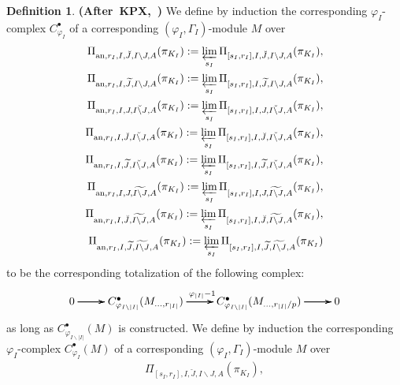 \documentclass[12pt]{amsart}
\theoremstyle{definition}
\newtheorem{definition}[theorem]{Definition}
\numberwithin{equation}{section}
\begin{document}
\begin{definition} \mbox{\bf{(After KPX, \cite[Definition 2.3.3]{KPX})}}
We define by induction the corresponding $\varphi_I$-complex $C^\bullet_{\varphi_I}$ of a corresponding $(\varphi_I,\Gamma_I)$-module $M$ over 
\begin{align}
\Pi_{\mathrm{an},r_I,I,\breve{J},I\backslash J,A}(\pi_{K_I}):=\varprojlim_{s_I}\Pi_{[s_I,r_I],I,\breve{J},I\backslash J,A}(\pi_{K_I}),\\	
\Pi_{\mathrm{an},r_I,I,\widetilde{J},I\backslash J,A}(\pi_{K_I}):=\varprojlim_{s_I} \Pi_{[s_I,r_I],I,\widetilde{J},I\backslash J,A}(\pi_{K_I}),\\
\Pi_{\mathrm{an},r_I,I,J,\breve{I\backslash J},A}(\pi_{K_I}):=\varprojlim_{s_I}\Pi_{[s_I,r_I],I,J,\breve{I\backslash J},A}(\pi_{K_I}),\\	
\Pi_{\mathrm{an},r_I,I,\breve{J},\breve{I\backslash J},A}(\pi_{K_I}):=\varprojlim_{s_I} \Pi_{[s_I,r_I],I,\breve{J},\breve{I\backslash J},A}(\pi_{K_I}),\\	
\Pi_{\mathrm{an},r_I,I,\widetilde{J},\breve{I\backslash J},A}(\pi_{K_I}):=\varprojlim_{s_I} \Pi_{[s_I,r_I],I,\widetilde{J},\breve{I\backslash J},A}(\pi_{K_I}),\\
\Pi_{\mathrm{an},r_I,I,J,\widetilde{I\backslash J},A}(\pi_{K_I}):=\varprojlim_{s_I} \Pi_{[s_I,r_I],I,J,\widetilde{I\backslash J},A}(\pi_{K_I}),\\	
\Pi_{\mathrm{an},r_I,I,\breve{J},\widetilde{I\backslash J},A}(\pi_{K_I}):=\varprojlim_{s_I} \Pi_{[s_I,r_I],I,\breve{J},\widetilde{I\backslash J},A}(\pi_{K_I}),\\	
\Pi_{\mathrm{an},r_I,I,\widetilde{J},\widetilde{I\backslash J},A}(\pi_{K_I}):=\varprojlim_{s_I} \Pi_{[s_I,r_I],I,\widetilde{J},\widetilde{I\backslash J},A}(\pi_{K_I})	
\end{align}
to be the corresponding totalization of the following complex:
\[
\xymatrix@C+0pc@R+0pc{
0 \ar[r] \ar[r] \ar[r] &C^\bullet_{\varphi_{I\backslash |I|}}(M_{...,r_{|I|}}) \ar[r]^{\varphi_{|I|}-1}\ar[r]\ar[r] &C^\bullet_{\varphi_{I\backslash |I|}}(M_{...,r_{|I|}/p}) \ar[r] \ar[r] \ar[r] &0
}
\]
as long as $C^\bullet_{\varphi_{I\backslash |I|}}(M)$ is constructed. We define by induction the corresponding $\varphi_I$-complex $C^\bullet_{\varphi_I}(M)$ of a corresponding $(\varphi_I,\Gamma_I)$-module $M$ over
\begin{align}
\Pi_{[s_I,r_I],I,\breve{J},I\backslash J,A}(\pi_{K_I}),\\	

\end{align}
\end{definition}
\end{document}
